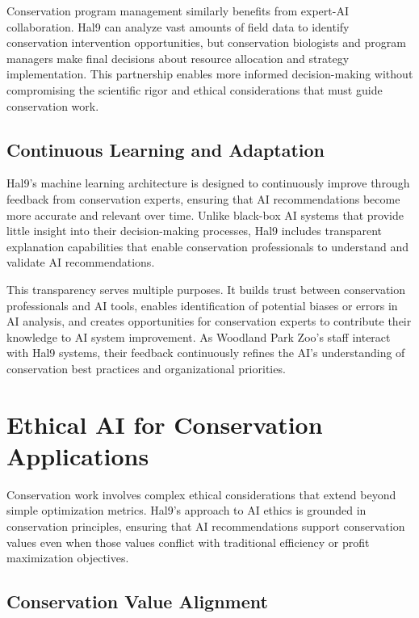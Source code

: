 \documentclass[
  Letterpaper,
]{scrbook}
\begin{document}
Conservation program management similarly benefits from expert-AI
collaboration. Hal9 can analyze vast amounts of field data to identify
conservation intervention opportunities, but conservation biologists and
program managers make final decisions about resource allocation and
strategy implementation. This partnership enables more informed
decision-making without compromising the scientific rigor and ethical
considerations that must guide conservation work.

\subsection{Continuous Learning and
Adaptation}\label{continuous-learning-and-adaptation}

Hal9's machine learning architecture is designed to continuously improve
through feedback from conservation experts, ensuring that AI
recommendations become more accurate and relevant over time. Unlike
black-box AI systems that provide little insight into their
decision-making processes, Hal9 includes transparent explanation
capabilities that enable conservation professionals to understand and
validate AI recommendations.

This transparency serves multiple purposes. It builds trust between
conservation professionals and AI tools, enables identification of
potential biases or errors in AI analysis, and creates opportunities for
conservation experts to contribute their knowledge to AI system
improvement. As Woodland Park Zoo's staff interact with Hal9 systems,
their feedback continuously refines the AI's understanding of
conservation best practices and organizational priorities.

\section{Ethical AI for Conservation
Applications}\label{ethical-ai-for-conservation-applications}

Conservation work involves complex ethical considerations that extend
beyond simple optimization metrics. Hal9's approach to AI ethics is
grounded in conservation principles, ensuring that AI recommendations
support conservation values even when those values conflict with
traditional efficiency or profit maximization objectives.

\subsection{Conservation Value
Alignment}\label{conservation-value-alignment}
\end{document}
